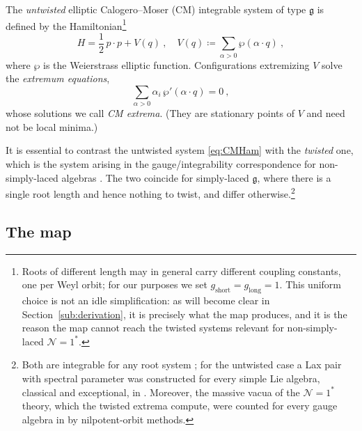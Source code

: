 \documentclass[aps, prx, nofootinbib, twocolumn,amsfonts,amsmath,amssymb,mathtools,superscriptaddress,preprintnumbers,floatfix,reprint]{revtex4-2}
\newcommand{\alg}{\mathfrak{g}}
\begin{document}
The \emph{untwisted} elliptic Calogero--Moser (CM) integrable system of type
$\alg$ \cite{Calogero:1975ii,Moser:1975qp,Olshanetsky:1981dk} is defined by the
Hamiltonian\footnote{Roots of different length may in general carry different
coupling constants, one per Weyl orbit; for our purposes we set
$g_\text{short}=g_\text{long}=1$. This uniform choice is not an idle
simplification: as will become clear in Section~\ref{sub:derivation}, it is precisely
what the map produces, and it is the reason the map cannot reach the twisted
systems relevant for non-simply-laced $\mathcal{N}=1^\ast$.}
\begin{equation}\label{eq:CMHam}
  H=\frac12\,p\cdot p+V(q)\ ,\quad V(q)\coloneqq\sum_{\alpha>0}\wp(\alpha\cdot q)\ ,
\end{equation}
where $\wp$ is the Weierstrass elliptic function. Configurations extremizing $V$ solve the \emph{extremum equations},
\begin{equation}\label{eq:CMeqn}
  \sum_{\alpha>0}\alpha_i\,\wp'(\alpha\cdot q)=0\ ,
\end{equation}
whose solutions we call \emph{CM extrema}. (They are stationary points of $V$
and need not be local minima.)

It is essential to contrast the untwisted system \eqref{eq:CMHam} with the
\emph{twisted} one, which is the system arising in the gauge/integrability
correspondence for non-simply-laced algebras \cite{DHoker:1998zuv}. The two
coincide for simply-laced $\alg$, where there is a single root length and hence
nothing to twist, and differ otherwise.\footnote{Both are integrable for any root system
\cite{Olshanetsky:1976,Olshanetsky:1981dk}; for the untwisted case a Lax pair
with spectral parameter was constructed for every simple Lie algebra, classical
and exceptional, in \cite{DHoker:1998xad}. Moreover, the massive vacua of the
$\mathcal{N}=1^\ast$ theory, which the twisted extrema compute, were counted for
every gauge algebra in \cite{Bourget:2015lua,Bourget:2015upj} by nilpotent-orbit methods.}

\subsection{The map}
\label{sub:themap}
\end{document}
